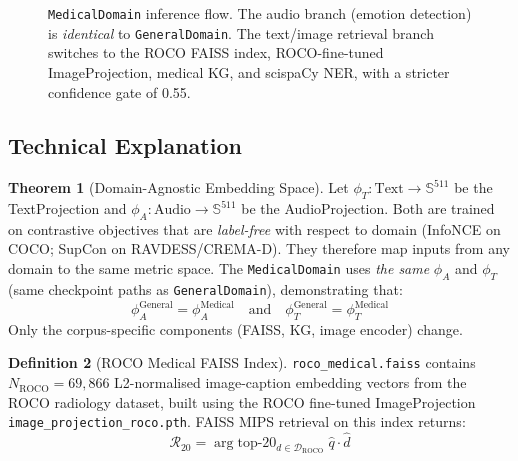 \documentclass[12pt,a4paper]{article}
\theoremstyle{definition}
\newtheorem{theorem}{Theorem}[section]
\newtheorem{definition}[theorem]{Definition}
\theoremstyle{remark}
\begin{document}
\begin{figure}[H]
\caption{\texttt{MedicalDomain} inference flow. The audio branch (emotion detection)
is \textit{identical} to \texttt{GeneralDomain}. The text/image retrieval branch
switches to the ROCO FAISS index, ROCO-fine-tuned ImageProjection, medical KG,
and scispaCy NER, with a stricter confidence gate of 0.55.}
\label{fig:med_domain}
\end{figure}

\subsection{Technical Explanation}

\begin{theorem}[Domain-Agnostic Embedding Space]
\label{thm:da}
Let $\phi_T: \text{Text} \to \mathbb{S}^{511}$ be the TextProjection and
$\phi_A: \text{Audio} \to \mathbb{S}^{511}$ be the AudioProjection.
Both are trained on contrastive objectives that are \emph{label-free}
with respect to domain (InfoNCE on COCO; SupCon on RAVDESS/CREMA-D).
They therefore map inputs from any domain to the same metric space.
The \texttt{MedicalDomain} uses \emph{the same} $\phi_A$ and $\phi_T$
(same checkpoint paths as \texttt{GeneralDomain}), demonstrating that:
\[
  \phi_A^{\text{General}} = \phi_A^{\text{Medical}}
  \quad\text{and}\quad
  \phi_T^{\text{General}} = \phi_T^{\text{Medical}}
\]
Only the corpus-specific components (FAISS, KG, image encoder) change.
\end{theorem}

\begin{definition}[ROCO Medical FAISS Index]
\texttt{roco\_medical.faiss} contains $N_{\text{ROCO}} = 69{,}866$
L2-normalised image-caption embedding vectors from the ROCO radiology
dataset, built using the ROCO fine-tuned ImageProjection
\texttt{image\_projection\_roco.pth}.
FAISS MIPS retrieval on this index returns:
\[
  \mathcal{R}_{20} = \arg\text{top-}20_{d \in \mathcal{D}_{\text{ROCO}}}\;
  \hat{q} \cdot \hat{d}
\]
\end{definition}
\end{document}
